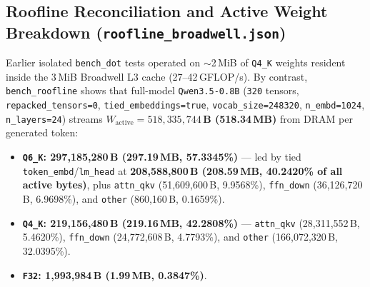 \documentclass[11pt,a4paper]{article}
\begin{document}
\subsection{Roofline Reconciliation and Active Weight Breakdown (\texttt{roofline\_broadwell.json})}
Earlier isolated \texttt{bench\_dot} tests operated on $\sim$2\,MiB of \texttt{Q4\_K} weights resident inside the 3\,MiB Broadwell L3 cache (27--42\,GFLOP/s). By contrast, \texttt{bench\_roofline} shows that full-model \texttt{Qwen3.5-0.8B} (\texttt{320} tensors, \texttt{repacked\_tensors=0}, \texttt{tied\_embeddings=true}, \texttt{vocab\_size=248320}, \texttt{n\_embd=1024}, \texttt{n\_layers=24}) streams \textbf{$W_{\mathrm{active}} = 518{,}335{,}744$\,B (518.34\,MB)} from DRAM per generated token:
\begin{itemize}
    \item \textbf{\texttt{Q6\_K}: 297,185,280\,B (297.19\,MB, 57.3345\%)} --- led by tied \texttt{token\_embd}/\texttt{lm\_head} at \textbf{208,588,800\,B (208.59\,MB, 40.2420\% of all active bytes)}, plus \texttt{attn\_qkv} (51,609,600\,B, 9.9568\%), \texttt{ffn\_down} (36,126,720\,B, 6.9698\%), and \texttt{other} (860,160\,B, 0.1659\%).
    \item \textbf{\texttt{Q4\_K}: 219,156,480\,B (219.16\,MB, 42.2808\%)} --- \texttt{attn\_qkv} (28,311,552\,B, 5.4620\%), \texttt{ffn\_down} (24,772,608\,B, 4.7793\%), and \texttt{other} (166,072,320\,B, 32.0395\%).
    \item \textbf{\texttt{F32}: 1,993,984\,B (1.99\,MB, 0.3847\%)}.
\end{itemize}
\end{document}
